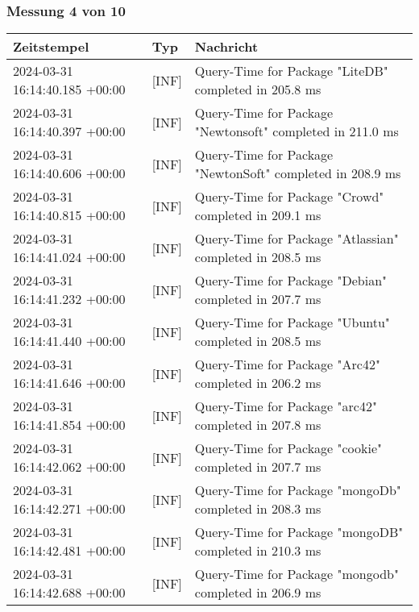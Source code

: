    \subsubsection{Messung 4 von 10} \label{subsubsec:MySQLOhneIndex4von10}
        {
            {\small
                \begin{tabularx}{\textwidth}{|l|l|X|}
                    \hline
                    \textbf{Zeitstempel} & \textbf{Typ} & \textbf{Nachricht} \\
                    \hline
                    \endhead
                    2024-03-31 16:14:40.185 +00:00 & [INF] & Query-Time for Package "LiteDB" completed in 205.8 ms \\
                    2024-03-31 16:14:40.397 +00:00 & [INF] & Query-Time for Package "Newtonsoft" completed in 211.0 ms \\
                    2024-03-31 16:14:40.606 +00:00 & [INF] & Query-Time for Package "NewtonSoft" completed in 208.9 ms \\
                    2024-03-31 16:14:40.815 +00:00 & [INF] & Query-Time for Package "Crowd" completed in 209.1 ms \\
                    2024-03-31 16:14:41.024 +00:00 & [INF] & Query-Time for Package "Atlassian" completed in 208.5 ms \\
                    2024-03-31 16:14:41.232 +00:00 & [INF] & Query-Time for Package "Debian" completed in 207.7 ms \\
                    2024-03-31 16:14:41.440 +00:00 & [INF] & Query-Time for Package "Ubuntu" completed in 208.5 ms \\
                    2024-03-31 16:14:41.646 +00:00 & [INF] & Query-Time for Package "Arc42" completed in 206.2 ms \\
                    2024-03-31 16:14:41.854 +00:00 & [INF] & Query-Time for Package "arc42" completed in 207.8 ms \\
                    2024-03-31 16:14:42.062 +00:00 & [INF] & Query-Time for Package "cookie" completed in 207.7 ms \\
                    2024-03-31 16:14:42.271 +00:00 & [INF] & Query-Time for Package "mongoDb" completed in 208.3 ms \\
                    2024-03-31 16:14:42.481 +00:00 & [INF] & Query-Time for Package "mongoDB" completed in 210.3 ms \\
                    2024-03-31 16:14:42.688 +00:00 & [INF] & Query-Time for Package "mongodb" completed in 206.9 ms \\

\end{tabularx}}}
